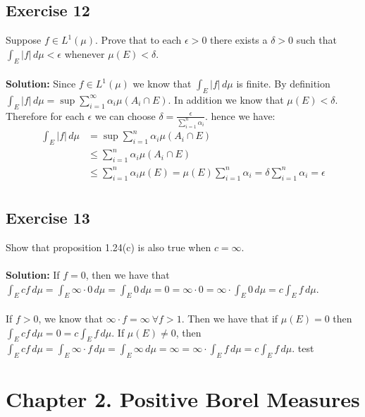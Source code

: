 \documentclass{article}
\begin{document}
\subsection*{Exercise 12}
Suppose $f \in L^1(\mu)$. Prove that to each $\epsilon > 0$ there exists a $\delta>0$ such that $\int_E |f| \,d\mu < \epsilon$
whenever $\mu(E) < \delta$.
\\\\
\textbf{Solution:}
Since $f\in L^1(\mu)$ we know that $\int_E |f| \, d\mu$ is finite.
By definition $\int_E |f| \, d\mu = \sup \sum_{i=1}^{\infty} \alpha_i \mu(A_i \cap E)$.
In addition we know that $\mu(E) < \delta$. Therefore for each $\epsilon$ we can choose $\delta = \frac{\epsilon}{\sum_{i=1}^{n} \alpha_i}$.
hence we have:
\begin{equation*}
    \begin{aligned}
        \int_E |f| \, d\mu &= \sup \sum_{i=1}^{n} \alpha_i \mu(A_i \cap E)\\
        &\le \sum_{i=1}^{n} \alpha_i \mu(A_i \cap E)\\
        &\le \sum_{i=1}^{n} \alpha_i \mu(E)  = \mu(E) \sum_{i=1}^{n} \alpha_i = \delta \sum_{i=1}^{n} \alpha_i = \epsilon \\
    \end{aligned}
\end{equation*}
\subsection*{Exercise 13}
Show that proposition 1.24(c) is also true when $c = \infty$.
\\\\
\textbf{Solution:}
If $f = 0$, then we have that $\int_E cf \,d\mu = \int_E \infty \cdot 0 \,d\mu = \int_E 0 \,d\mu = 0 = \infty \cdot 0 = \infty \cdot \int_E 0 \,d\mu =  c \int_E f \,d\mu$.
\\\\
If $f > 0$, we know that $\infty \cdot f = \infty \ \forall f>1$.
Then we have that if $\mu(E) = 0$ then $\int_E cf \,d\mu = 0 =  c \int_E f \,d\mu$.
If $\mu(E) \neq 0$, then $\int_E cf \,d\mu = \int_E \infty \cdot f \,d\mu = \int_E \infty \,d\mu = \infty = \infty \cdot \int_E f \,d\mu = c\int_E f \,d\mu$.
test


\section*{Chapter 2. Positive Borel Measures}
\end{document}
